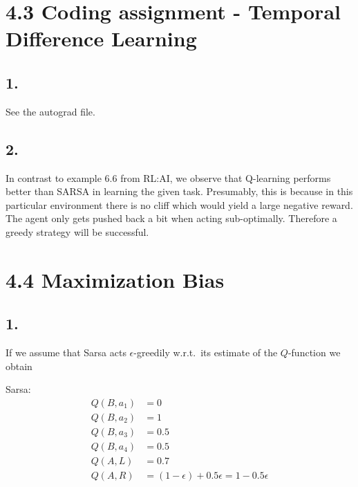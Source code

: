 \documentclass{article}
\begin{document}
\begin{comment}
\section*{3.2 Importance Sampling in Monte Carlo methods}
\subsection*{1. Disadvantage of ordinary IS in off-policy MC}

\subsection*{2. Disadvantage of weighted IS in off-policy MC}
\end{comment}


\section*{4.3 Coding assignment - Temporal Difference Learning}
\subsection*{1.}
See the autograd file.

\subsection*{2.}
In contrast to example 6.6 from RL:AI, we observe that Q-learning performs better than SARSA in learning the given task. Presumably, this is because in this particular environment there is no cliff which would yield a large negative reward. The agent only gets pushed back a bit when acting sub-optimally. Therefore a greedy strategy will be successful.

\section*{4.4 Maximization Bias}
\subsection*{1.}

If we assume that Sarsa acts $\epsilon$-greedily w.r.t.\ its estimate of the $Q$-function we obtain

Sarsa:
\begin{align*}
Q(B, a_1) &= 0\\
Q(B, a_2) &= 1\\
Q(B, a_3) &= 0.5\\
Q(B, a_4) &= 0.5\\
Q(A, L) &=  0.7\\
Q(A, R) &=  (1-\epsilon) + 0.5\epsilon = 1-0.5\epsilon
\end{align*}
\end{document}
